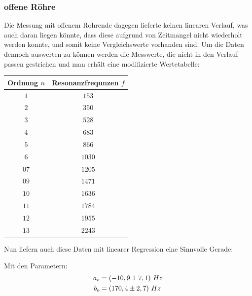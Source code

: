 \subsubsection{offene Röhre}
Die Messung mit offenem Rohrende dagegen lieferte keinen linearen Verlauf, was auch daran liegen könnte, dass diese aufgrund von Zeitmangel nicht wiederholt werden konnte, und somit keine Vergleichswerte vorhanden sind. Um die Daten dennoch auswerten zu können werden die Messwerte, die nicht in den Verlauf passen gestrichen und man erhält eine modifizierte Wertetabelle:
\begin{center}
\begin{tabular}{c|c}
Ordnung \(n\) & Resonanzfrequnzen \(f\) \\\hline
\(1\) & \( 153\) \\ 
\(2\) & \( 350\) \\ 
\(3\) & \( 528\) \\ 
\(4\) & \( 683\) \\ 
\(5\) & \( 866\) \\ 
\(6\) & \( 1030\) \\ 
\(07\) & \( 1205\) \\ 
\(09\) & \( 1471\) \\ 
\(10\) & \( 1636\) \\ 
\(11\) & \( 1784\) \\ 
\(12\) & \( 1955\) \\ 
\(13\) & \( 2243\) \\
\end{tabular}
\end{center}
Nun liefern auch diese Daten mit linearer Regression eine Sinnvolle Gerade:

\begin{center}
\noindent
\begin{minipage}{\linewidth}
\centering
{}
\end{minipage}
\end{center}
Mit den Parametern:
\begin{align}
a_o &= \left( -10,9 \pm 7,1 \right)\, Hz \notag \\ 
b_o &= \left( 170,4 \pm 2,7 \right)\, Hz \notag
\end{align}
